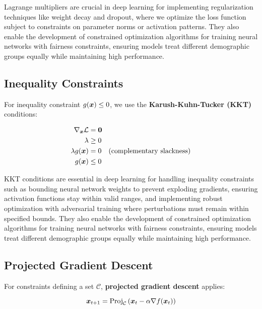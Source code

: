 \begin{remark}
Lagrange multipliers are crucial in deep learning for implementing regularization techniques like weight decay and dropout, where we optimize the loss function subject to constraints on parameter norms or activation patterns. They also enable the development of constrained optimization algorithms for training neural networks with fairness constraints, ensuring models treat different demographic groups equally while maintaining high performance.
\end{remark}

\subsection{Inequality Constraints}

For inequality constraint $g(\boldsymbol{x}) \leq 0$, we use the \textbf{Karush-Kuhn-Tucker (KKT)} conditions:

\begin{align}
\nabla_{\boldsymbol{x}} \mathcal{L} &= \boldsymbol{0} \\
\lambda &\geq 0 \\
\lambda g(\boldsymbol{x}) &= 0 \quad \text{(complementary slackness)} \\
g(\boldsymbol{x}) &\leq 0
\end{align}

\begin{remark}
KKT conditions are essential in deep learning for handling inequality constraints such as bounding neural network weights to prevent exploding gradients, ensuring activation functions stay within valid ranges, and implementing robust optimization with adversarial training where perturbations must remain within specified bounds. They also enable the development of constrained optimization algorithms for training neural networks with fairness constraints, ensuring models treat different demographic groups equally while maintaining high performance.
\end{remark}

\subsection{Projected Gradient Descent}

For constraints defining a set $\mathcal{C}$, \textbf{projected gradient descent} applies:

\begin{equation}
\boldsymbol{x}_{t+1} = \text{Proj}_{\mathcal{C}}\left(\boldsymbol{x}_t - \alpha \nabla f(\boldsymbol{x}_t)\right)
\end{equation}

